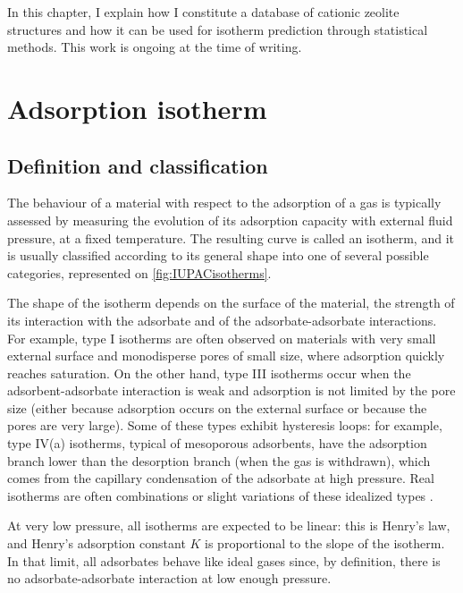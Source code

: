\documentclass[main.tex]{subfiles}
\begin{document}
In this chapter, I explain how I constitute a database of cationic zeolite structures and how it can be used for isotherm prediction through statistical methods. This work is ongoing at the time of writing.

\section{Adsorption isotherm}

\subsection{Definition and classification}

\label{isotherms}

The behaviour of a material with respect to the adsorption of a gas is typically assessed by measuring the evolution of its adsorption capacity with external fluid pressure, at a fixed temperature. The resulting curve is called an isotherm, and it is usually classified according to its general shape into one of several possible categories, represented on \cref{fig:IUPACisotherms}.

The shape of the isotherm depends on the surface of the material, the strength of its interaction with the adsorbate and of the adsorbate-adsorbate interactions. For example, type I isotherms are often observed on materials with very small external surface and monodisperse pores of small size, where adsorption quickly reaches saturation. On the other hand, type III isotherms occur when the adsorbent-adsorbate interaction is weak and adsorption is not limited by the pore size (either because adsorption occurs on the external surface or because the pores are very large). Some of these types exhibit hysteresis loops: for example, type IV(a) isotherms, typical of mesoporous adsorbents, have the adsorption branch lower than the desorption branch (when the gas is withdrawn), which comes from the capillary condensation of the adsorbate at high pressure. Real isotherms are often combinations or slight variations of these idealized types \autocite{BrandaniIsotherms2016}.

At very low pressure, all isotherms are expected to be linear: this is Henry's law, and Henry's adsorption constant $K$ is proportional to the slope of the isotherm. In that limit, all adsorbates behave like ideal gases since, by definition, there is no adsorbate-adsorbate interaction at low enough pressure.
\end{document}
